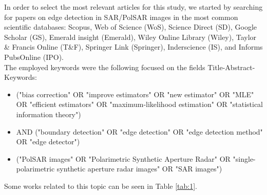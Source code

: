In order to select the most relevant articles for this study, we started by searching for papers on edge detection in SAR/PolSAR images in the most common scientific databases: Scopus, Web of Science (WoS), Science Direct (SD), Google Scholar (GS), Emerald insight (Emerald), Wiley Online Library (Wiley), Taylor \& Francis Online (T\&F), Springer Link (Springer), Inderscience (IS), and Informs PubsOnline (IPO). \\ %
The employed keywords were the following focused on the fields Title-Abstract-Keywords:
\begin{itemize}
	\item ("bias correction" OR "improve estimators" OR "new estimator" OR "MLE" OR "efficient estimators" OR "maximum-likelihood estimation" OR "statistical information theory")  
\item	AND ("boundary detection" OR "edge detection" OR "edge detection method" OR "edge detector") 
\item ("PolSAR images" OR "Polarimetric Synthetic Aperture Radar" OR "single-polarimetric synthetic aperture radar images" OR "SAR images")
\end{itemize}
Some works related to this topic can be seen in Table \ref{tab:1}.
